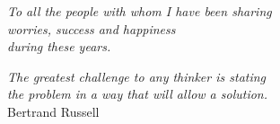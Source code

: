 \thispagestyle{empty}
\null {}
        \begin{flushright}
        \emph{To all the people with whom I have been sharing \\ worries, success and happiness \\ during these years.}
        \end{flushright}
\null
%
\newpage
%
\thispagestyle{empty}
\null {}
        \begin{flushright}
        \emph{The greatest challenge to any thinker is stating \\ the problem in a way that will allow a solution.} \\%
        Bertrand Russell
        \end{flushright}
\null